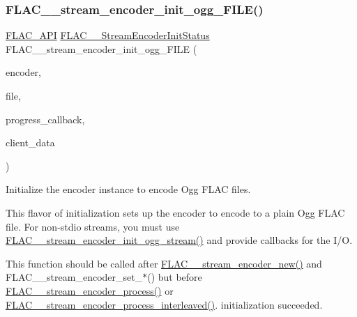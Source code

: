 \subsubsection{\texorpdfstring{FLAC\_\_stream\_encoder\_init\_ogg\_FILE()}{FLAC\_\_stream\_encoder\_init\_ogg\_FILE()}}
{\footnotesize\ttfamily \mbox{\hyperlink{group__flac__export_ga56ca07df8a23310707732b1c0007d6f5}{F\+L\+A\+C\+\_\+\+A\+PI}} \mbox{\hyperlink{group__flac__stream__encoder_ga3bb869620af2b188d77982a5c30b047d}{F\+L\+A\+C\+\_\+\+\_\+\+Stream\+Encoder\+Init\+Status}} F\+L\+A\+C\+\_\+\+\_\+stream\+\_\+encoder\+\_\+init\+\_\+ogg\+\_\+\+F\+I\+LE (\begin{DoxyParamCaption}\item[{\mbox{\hyperlink{struct_f_l_a_c_____stream_encoder}{F\+L\+A\+C\+\_\+\+\_\+\+Stream\+Encoder}} $\ast$}]{encoder,  }\item[{F\+I\+LE $\ast$}]{file,  }\item[{\mbox{\hyperlink{group__flac__stream__encoder_ga6e051c0e5837433f9e7cd56cd42ca6ba}{F\+L\+A\+C\+\_\+\+\_\+\+Stream\+Encoder\+Progress\+Callback}}}]{progress\+\_\+callback,  }\item[{\mbox{\hyperlink{_s_d_l__opengles2__gl2ext_8h_ae5d8fa23ad07c48bb609509eae494c95}{void}} $\ast$}]{client\+\_\+data }\end{DoxyParamCaption})}

Initialize the encoder instance to encode Ogg F\+L\+AC files.

This flavor of initialization sets up the encoder to encode to a plain Ogg F\+L\+AC file. For non-\/stdio streams, you must use \mbox{\hyperlink{group__flac__stream__encoder_ga87af71d74c09f7d482f9f420ef9bf826}{F\+L\+A\+C\+\_\+\+\_\+stream\+\_\+encoder\+\_\+init\+\_\+ogg\+\_\+stream()}} and provide callbacks for the I/O.

This function should be called after \mbox{\hyperlink{group__flac__stream__encoder_ga35f3d94452bcf0a90a31c7d770b200bc}{F\+L\+A\+C\+\_\+\+\_\+stream\+\_\+encoder\+\_\+new()}} and F\+L\+A\+C\+\_\+\+\_\+stream\+\_\+encoder\+\_\+set\+\_\+$\ast$() but before \mbox{\hyperlink{group__flac__stream__encoder_gae187ec4f6cab3ca109637996ee23272d}{F\+L\+A\+C\+\_\+\+\_\+stream\+\_\+encoder\+\_\+process()}} or \mbox{\hyperlink{group__flac__stream__encoder_ga67c2ff5b23b945180797de420b1f27c0}{F\+L\+A\+C\+\_\+\+\_\+stream\+\_\+encoder\+\_\+process\+\_\+interleaved()}}. initialization succeeded.


